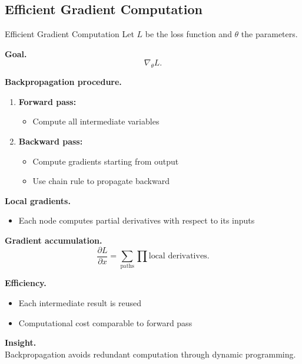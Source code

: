 \documentclass[aspectratio=169,11pt]{beamer}
\begin{document}
\subsection{Efficient Gradient Computation}
\begin{frame}[t,allowframebreaks]{Efficient Gradient Computation}
\small
Let $L$ be the loss function and $\theta$ the parameters.

\textbf{Goal.}\\ \[
\nabla_\theta L.
\]

\textbf{Backpropagation procedure.}\\ \begin{enumerate}
    \item \textbf{Forward pass:}\\ \begin{itemize}
        \item Compute all intermediate variables
    \end{itemize}

    \item \textbf{Backward pass:}\\ \begin{itemize}
        \item Compute gradients starting from output
        \item Use chain rule to propagate backward
    \end{itemize}
\end{enumerate}

\textbf{Local gradients.}\\ \begin{itemize}
    \item Each node computes partial derivatives with respect to its inputs
\end{itemize}

\textbf{Gradient accumulation.}\\ \[
\frac{\partial L}{\partial x} = \sum_{\text{paths}} \prod \text{local derivatives}.
\]

\textbf{Efficiency.}\\ \begin{itemize}
    \item Each intermediate result is reused
    \item Computational cost comparable to forward pass
\end{itemize}

\textbf{Insight.}\\ Backpropagation avoids redundant computation through dynamic programming.
\end{frame}
\end{document}
